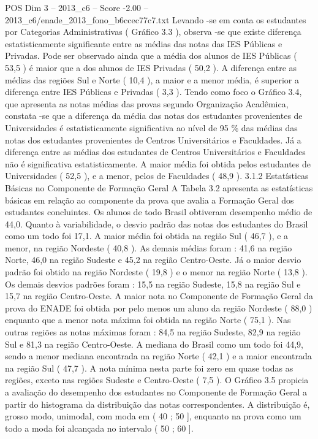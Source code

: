 \begin{textsample}{POS Dim 3 – 2013\_c6 – Score -2.00 – 2013\_c6/enade\_2013\_fono\_b6ccec77c7.txt}
Levando -se em conta os estudantes por Categorias Administrativas ( Gráfico 3.3 ), observa -se que existe diferença estatisticamente significante entre as médias das notas das IES Públicas e Privadas.
Pode ser observado ainda que a média dos alunos de IES Públicas ( 53,5 ) é maior que a dos alunos de IES Privadas ( 50,2 ).
A diferença entre as médias das regiões Sul e Norte ( 10,4 ), a maior e a menor média, é superior a diferença entre IES Públicas e Privadas ( 3,3 ).
Tendo como foco o Gráfico 3.4, que apresenta as notas médias das provas segundo Organização Acadêmica, constata -se que a diferença da média das notas dos estudantes provenientes de Universidades é estatisticamente significativa ao nível de 95 \% das médias das notas dos estudantes provenientes de Centros Universitários e Faculdades.
Já a diferença entre as médias dos estudantes de Centros Universitários e Faculdades não é significativa estatisticamente.
A maior média foi obtida pelos estudantes de Universidades ( 52,5 ), e a menor, pelos de Faculdades ( 48,9 ). 3.1.2 Estatísticas Básicas no Componente de Formação Geral A Tabela 3.2 apresenta as estatísticas básicas em relação ao componente da prova que avalia a Formação Geral dos estudantes concluintes.
Os alunos de todo Brasil obtiveram desempenho médio de 44,0.
Quanto à variabilidade, o desvio padrão das notas dos estudantes do Brasil como um todo foi 17,1.
A maior média foi obtida na região Sul ( 46,7 ), e a menor, na região Nordeste ( 40,8 ).
As demais médias foram : 41,6 na região Norte, 46,0 na região Sudeste e 45,2 na região Centro-Oeste.
Já o maior desvio padrão foi obtido na região Nordeste ( 19,8 ) e o menor na região Norte ( 13,8 ).
Os demais desvios padrões foram : 15,5 na região Sudeste, 15,8 na região Sul e 15,7 na região Centro-Oeste.
A maior nota no Componente de Formação Geral da prova do ENADE foi obtida por pelo menos um aluno da região Nordeste ( 88,0 ) enquanto que a menor nota máxima foi obtida na região Norte ( 75,1 ).
Nas outras regiões as notas máximas foram : 84,5 na região Sudeste, 82,9 na região Sul e 81,3 na região Centro-Oeste.
A mediana do Brasil como um todo foi 44,9, sendo a menor mediana encontrada na região Norte ( 42,1 ) e a maior encontrada na região Sul ( 47,7 ).
A nota mínima nesta parte foi zero em quase todas as regiões, exceto nas regiões Sudeste e Centro-Oeste ( 7,5 ).
O Gráfico 3.5 propicia a avaliação do desempenho dos estudantes no Componente de Formação Geral a partir do histograma da distribuição das notas correspondentes.
A distribuição é, grosso modo, unimodal, com moda em ( 40 ; 50 ], enquanto na prova como um todo a moda foi alcançada no intervalo ( 50 ; 60 ].

\end{textsample}
